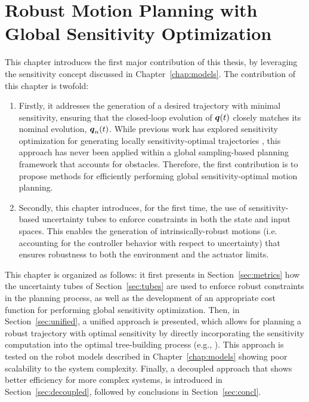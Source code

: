 \chapter{Robust Motion Planning with Global Sensitivity Optimization}\label{chap:samp}

This chapter introduces the first major contribution of this thesis, by leveraging the sensitivity concept discussed in Chapter~\ref{chap:models}.
The contribution of this chapter is twofold:
\begin{enumerate}
    \item Firstly, it addresses the generation of a desired trajectory with minimal sensitivity, ensuring that the closed-loop evolution of $\boldsymbol{q}(t)$ closely matches its nominal evolution, $\boldsymbol{q}_n(t)$. 
    While previous work has explored sensitivity optimization for generating locally sensitivity-optimal trajectories \cite{cPi, cTh}, this approach has never been applied within a global sampling-based planning framework that accounts for obstacles. 
    Therefore, the first contribution is to propose methods for efficiently performing global sensitivity-optimal motion planning.
    \item Secondly, this chapter introduces, for the first time, the use of sensitivity-based uncertainty tubes to enforce constraints in both the state and input spaces. 
    This enables the generation of intrinsically-robust motions (i.e. accounting for the controller behavior with respect to uncertainty) that ensures robustness to both the environment and the actuator limits.
\end{enumerate}
This chapter is organized as follows: it first presents in Section~\ref{sec:metrics} how the uncertainty tubes of Section~\ref{sec:tubes} are used to enforce robust constraints in the planning process, as well as the development of an appropriate cost function for performing global sensitivity optimization.
Then, in Section~\ref{sec:unified}, a unified approach is presented, which allows for planning a robust trajectory with optimal sensitivity by directly incorporating the sensitivity computation into the optimal tree-building process (e.g., ). 
This approach is tested on the robot models described in Chapter~\ref{chap:models} showing poor scalability to the system complexity.
Finally, a decoupled approach that shows better efficiency for more complex systems, is introduced in Section~\ref{sec:decoupled}, followed by conclusions in Section~\ref{sec:concl}.

